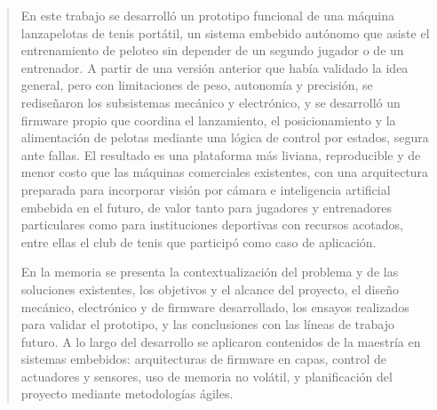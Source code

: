 \documentclass[
    11pt,
    spanish,
    singlespacing,
    parskip,
    headsepline,
    bookmarks=true,
    unicode=true,
    pdftoolbar=true,
    pdfmenubar=true,
    pdffitwindow=false,
    colorlinks=true,
    linkcolor=blue,
    citecolor=blue,
    urlcolor=blue
]{MastersDoctoralThesis}
\begin{document}



\frontmatter %
\pagestyle{plain} %


\begin{abstract}
\addchaptertocentry{\abstractname} %
En este trabajo se desarrolló un prototipo funcional de una máquina lanzapelotas de tenis portátil, un sistema embebido autónomo que asiste el entrenamiento de peloteo sin depender de un segundo jugador o de un entrenador. A partir de una versión anterior que había validado la idea general, pero con limitaciones de peso, autonomía y precisión, se rediseñaron los subsistemas mecánico y electrónico, y se desarrolló un firmware propio que coordina el lanzamiento, el posicionamiento y la alimentación de pelotas mediante una lógica de control por estados, segura ante fallas. El resultado es una plataforma más liviana, reproducible y de menor costo que las máquinas comerciales existentes, con una arquitectura preparada para incorporar visión por cámara e inteligencia artificial embebida en el futuro, de valor tanto para jugadores y entrenadores particulares como para instituciones deportivas con recursos acotados, entre ellas el club de tenis que participó como caso de aplicación.

En la memoria se presenta la contextualización del problema y de las soluciones existentes, los objetivos y el alcance del proyecto, el diseño mecánico, electrónico y de firmware desarrollado, los ensayos realizados para validar el prototipo, y las conclusiones con las líneas de trabajo futuro. A lo largo del desarrollo se aplicaron contenidos de la maestría en sistemas embebidos: arquitecturas de firmware en capas, control de actuadores y sensores, uso de memoria no volátil, y planificación del proyecto mediante metodologías ágiles.
\end{abstract}

\end{document}
